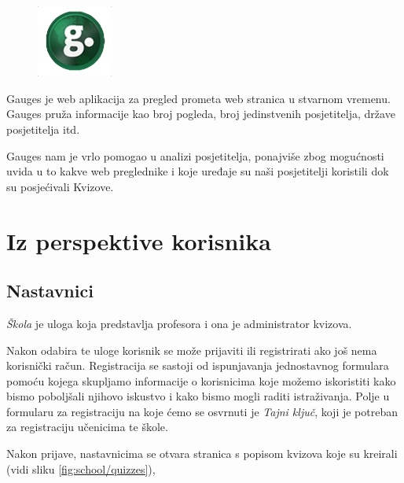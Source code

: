 \documentclass{scrreprt}
\begin{document}
\begin{figure}
  \vspace{-10pt}
  \includegraphics[width=2.5cm]{logos/gauges}
  \vspace{-30pt}
\end{figure}

Gauges je web aplikacija za pregled prometa web stranica u stvarnom vremenu.
Gauges pruža informacije kao broj pogleda, broj jedinstvenih posjetitelja,
države posjetitelja itd.\cite{gauges}

Gauges nam je vrlo pomogao u analizi posjetitelja, ponajviše zbog mogućnosti
uvida u to kakve web preglednike i koje uređaje su naši posjetitelji koristili
dok su posjećivali Kvizove.

\section{Iz perspektive korisnika}

\subsection{Nastavnici}

\emph{Škola} je uloga koja predstavlja profesora i ona je administrator kvizova.

Nakon odabira te uloge korisnik se može prijaviti ili registrirati ako još nema
korisnički račun. Registracija se sastoji od ispunjavanja jednostavnog formulara
pomoću kojega skupljamo informacije o korisnicima koje možemo iskoristiti kako
bismo poboljšali njihovo iskustvo i kako bismo mogli raditi istraživanja. Polje
u formularu za registraciju na koje ćemo se osvrnuti je \emph{Tajni ključ}, koji
je potreban za registraciju učenicima te škole.

Nakon prijave, nastavnicima se otvara stranica s popisom kvizova koje su
kreirali (vidi sliku \ref{fig:school/quizzes}),
\end{document}
